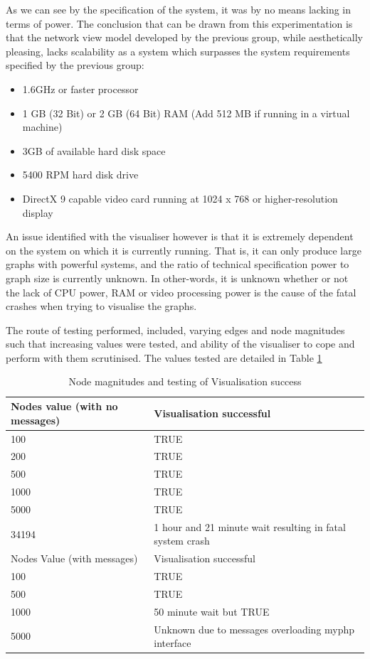 As we can see by the specification of the system, it was by no means lacking in terms of power. The conclusion that can be drawn from this experimentation is that the network view model developed by the previous group, while aesthetically pleasing, lacks scalability as a system which surpasses the system requirements specified by the previous group:

\begin{itemize}
	\item 1.6GHz or faster processor
	
	\item 1 GB (32 Bit) or 2 GB (64 Bit) RAM (Add 512 MB if running in a virtual machine)
	
	\item 3GB of available hard disk space
	
	\item	5400 RPM hard disk drive
	
	\item DirectX 9 capable video card running at 1024 x 768 or higher-resolution display
\end{itemize}

An issue identified with the visualiser however is that it is extremely
dependent on the system on which it is currently running. That is, it can only
produce large graphs with powerful systems, and the ratio of technical
specification power to graph size is currently unknown. In other-words, it is
unknown whether or not the lack of CPU power, RAM or video processing power is
the cause of the fatal crashes when trying to visualise the graphs. 

The route of testing performed, included, varying edges and node magnitudes such
that increasing values were tested, and ability of the visualiser to cope and
perform with them scrutinised. The values tested are detailed in Table
\ref{tab:lol}

\begin{table}[htbp]%
\centering
\begin{tabular}{|l|l|}
\hline
Nodes value (with no messages) & Visualisation successful  \\
\hline
100 & TRUE \\
200 & TRUE \\
500 & TRUE \\
1000 & TRUE \\
5000 & TRUE \\
34194 & 1 hour and 21 minute wait resulting in fatal system crash \\
\hline
Nodes Value (with messages) & Visualisation successful \\
100 & TRUE \\
500 & TRUE \\
1000 & 50 minute wait but TRUE \\
5000 & Unknown due to messages overloading myphp interface \\
\hline
\end{tabular}
\caption{Node magnitudes and testing of Visualisation success}
\label{tab:lol}
\end{table}

